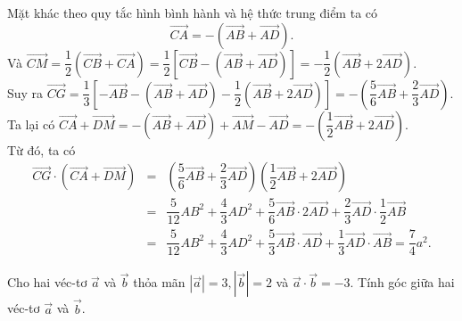 \begin{bt}
{\begin{enumerate}
			Mặt khác theo quy tắc hình bình hành và hệ thức trung điểm ta có $$\overrightarrow{CA}=-\left(\overrightarrow{AB}+\overrightarrow{AD}\right).$$
			Và
			$\overrightarrow{CM}=\dfrac{1}{2}\left(\overrightarrow{CB}+\overrightarrow{CA}\right)=\dfrac{1}{2}\left[\overrightarrow{CB}-\left(\overrightarrow{AB}+\overrightarrow{AD}\right)\right]=-\dfrac{1}{2}\left(\overrightarrow{AB}+2\overrightarrow{AD}\right)$.
			\\
			Suy ra
			$\overrightarrow{CG}=\dfrac{1}{3}[-\overrightarrow{AB}-\left(\overrightarrow{AB}+\overrightarrow{AD}\right)-\dfrac{1}{2}\left(\overrightarrow{AB}+2\overrightarrow{AD}\right)]=-\left(\dfrac{5}{6}\overrightarrow{AB}+\dfrac{2}{3}\overrightarrow{AD}\right)$.
			\\
			Ta lại có
			$\overrightarrow{CA}+\overrightarrow{DM}=-\left(\overrightarrow{AB}+\overrightarrow{AD}\right)+\overrightarrow{AM}-\overrightarrow{AD}=-\left(\dfrac{1}{2}\overrightarrow{AB}+2\overrightarrow{AD}\right)$.
			\\
			Từ đó, ta có
			\begin{eqnarray*} \overrightarrow{CG}\cdot\left(\overrightarrow{CA}+\overrightarrow{DM}\right)&=&\left(\dfrac{5}{6}\overrightarrow{AB}+\dfrac{2}{3}\overrightarrow{AD}\right)\left(\dfrac{1}{2}\overrightarrow{AB}+2\overrightarrow{AD}\right) \\ &=&\dfrac{5}{12}AB^2+\dfrac{4}{3}AD^2+\dfrac{5}{6}\overrightarrow{AB}\cdot2\overrightarrow{AD}+\dfrac{2}{3}\overrightarrow{AD}\cdot\dfrac{1}{2}\overrightarrow{AB} \\
				&=& \dfrac{5}{12}AB^2+\dfrac{4}{3}AD^2+\dfrac{5}{3}\overrightarrow{AB}\cdot\overrightarrow{AD}+\dfrac{1}{3}\overrightarrow{AD}\cdot\overrightarrow{AB}=\dfrac{7}{4}a^2.
			\end{eqnarray*}
		\end{enumerate}
	}
\end{bt}

\begin{bt}%
	Cho hai véc-tơ $\overrightarrow{a}$ và $\overrightarrow{b}$ thỏa mãn $\left|\overrightarrow{a}\right|=3,\left|\overrightarrow{b}\right|=2$ và $\overrightarrow{a}\cdot\overrightarrow{b}=-3$. Tính góc giữa hai véc-tơ $\overrightarrow{a}$ và $\overrightarrow{b}$. 
\end{bt}

